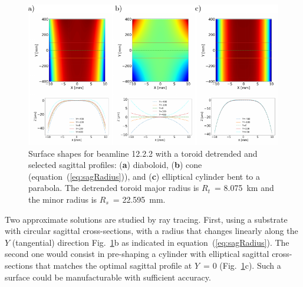 \documentclass[preprint]{iucr}       %
\newcommand{\inred}[1]{{\color{red}#1}}
\begin{document}
\begin{figure}\label{fig:detrendedBeamline}
\includegraphics[width=1.0\textwidth]{figures/fig8.pdf}
% 

\caption{Surface shapes for \inred{beamline} 12.2.2 with a toroid detrended and selected sagittal profiles: (\textbf{a}) diaboloid, (\textbf{b}) cone (equation~(\ref{eq:sagRadius})), and (\textbf{c}) elliptical cylinder bent to a parabola. The detrended toroid major radius is $R_t$~= \SI{8.075}{\kilo\meter} and the minor radius is $R_s$~= \SI{22.595}{\milli\meter}.}
\end{figure}

Two approximate solutions are studied by ray tracing. First, using a substrate with circular sagittal cross-sections, with a radius that changes linearly along the $Y$ (tangential) direction Fig.~\ref{fig:detrendedBeamline}b as indicated in equation~(\ref{eq:sagRadius}). The second one
would consist in pre-shaping a cylinder with elliptical sagittal cross-sections that matches the optimal sagittal profile at $Y$~= 0 (Fig.~\ref{fig:detrendedBeamline}c). Such a surface could be manufacturable with sufficient accuracy.
\end{document}
